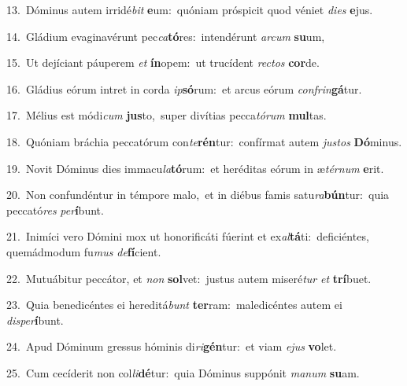 {\numbfont\textcolor{\numbcolor}{13.}}~Dóminus autem irridé\textit{bit} \textbf{e}\-um:~\star quóniam próspicit quod véniet \textit{di}\-\textit{es} \textbf{e}\-jus.\par
{\numbfont\textcolor{\numbcolor}{14.}}~Gládium evaginavérunt pec\-\textit{ca}\-\textbf{tó}res:~\star intendérunt \textit{ar}\-\textit{cum} \textbf{su}\-um,\par
{\numbfont\textcolor{\numbcolor}{15.}}~Ut dejíciant páuperem \textit{et} \textbf{ín}\-opem:~\star ut trucídent \textit{rec}\-\textit{tos} \textbf{cor}\-de.\par
{\numbfont\textcolor{\numbcolor}{16.}}~Gládius eórum intret in corda \textit{ip}\-\textbf{só}rum:~\star et arcus eórum \textit{con}\-\textit{frin}\textbf{gá}tur.\par
{\numbfont\textcolor{\numbcolor}{17.}}~Mélius est módi\textit{cum} \textbf{jus}\-to,~\star super divítias pecca\-\textit{tó}\-\textit{rum} \textbf{mul}\-tas.\par
{\numbfont\textcolor{\numbcolor}{18.}}~Quóniam bráchia peccatórum con\-\textit{te}\-\textbf{rén}tur:~\star confírmat autem \textit{jus}\-\textit{tos} \textbf{Dó}\-minus.\par
{\numbfont\textcolor{\numbcolor}{19.}}~Novit Dóminus dies immacu\-\textit{la}\-\textbf{tó}rum:~\star et heréditas eórum in æ\-\textit{tér}\-\textit{num} \textbf{e}\-rit.\par
{\numbfont\textcolor{\numbcolor}{20.}}~Non confundéntur in témpore malo,~\dagger et in diébus famis satu\-\textit{ra}\-\textbf{bún}tur:~\star quia peccató\textit{res} \textit{per}\-\textbf{í}bunt.\par
{\numbfont\textcolor{\numbcolor}{21.}}~Inimíci vero Dómini mox ut honorificáti fúerint et ex\-\textit{al}\-\textbf{tá}ti:~\star deficiéntes, quemádmodum fu\textit{mus} \textit{de}\-\textbf{fí}cient.\par
{\numbfont\textcolor{\numbcolor}{22.}}~Mutuábitur peccátor, et \textit{non} \textbf{sol}\-vet:~\star justus autem miseré\textit{tur} \textit{et} \textbf{trí}\-buet.\par
{\numbfont\textcolor{\numbcolor}{23.}}~Quia benedicéntes ei hereditá\textit{bunt} \textbf{ter}\-ram:~\star maledicéntes autem ei \textit{dis}\-\textit{per}\textbf{í}bunt.\par
{\numbfont\textcolor{\numbcolor}{24.}}~Apud Dóminum gressus hóminis di\-\textit{ri}\-\textbf{gén}tur:~\star et viam \textit{e}\-\textit{jus} \textbf{vo}\-let.\par
{\numbfont\textcolor{\numbcolor}{25.}}~Cum cecíderit non col\-\textit{li}\-\textbf{dé}tur:~\star quia Dóminus suppónit \textit{ma}\-\textit{num} \textbf{su}\-am.\par
